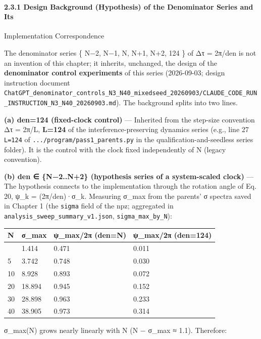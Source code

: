 \documentclass[
  a4paper,
]{ltjsarticle}
\newcounter{none} %
\begin{document}
\paragraph{2.3.1 Design Background (Hypothesis) of the Denominator
Series and
Its}\label{design-background-hypothesis-of-the-denominator-series-and-its}

Implementation Correspondence

The denominator series \{ N−2, N−1, N, N+1, N+2, 124 \} of Δτ = 2π/den
is not an invention of this chapter; it inherits, unchanged, the design
of the \textbf{denominator control experiments} of this series
(2026-09-03; design instruction document
\texttt{ChatGPT\_denominator\_controls\_N3\_N40\_mixedseed\_20260903/CLAUDE\_CODE\_RUN\_INSTRUCTION\_N3\_N40\_20260903.md}).
The background splits into two lines.

\textbf{(a) den=124 (fixed-clock control)} --- Inherited from the
step-size convention Δτ = 2π/L, \textbf{L=124} of the
interference-preserving dynamics series (e.g., line 27 \texttt{L=124} of
\texttt{.../program/pass1\_parents.py} in the qualification-and-seedless
series folder). It is the control with the clock fixed independently of
N (legacy convention).

\textbf{(b) den ∈ \{N−2..N+2\} (hypothesis series of a system-scaled
clock)} --- The hypothesis connects to the implementation through the
rotation angle of Eq. 20, ψ\_k = (2π/den)·σ\_k. Measuring σ\_max from
the parents' σ spectra saved in Chapter 1 (the \texttt{sigma} field of
the npz; aggregated in \texttt{analysis\_sweep\_summary\_v1.json},
\texttt{sigma\_max\_by\_N}):

{\def\LTcaptype{none} %
\begin{longtable}[]{@{}llll@{}}
\toprule\noalign{}
N & σ\_max & ψ\_max/2π (den=N) & ψ\_max/2π (den=124) \\
\midrule\noalign{}
\endhead
\bottomrule\noalign{}
\endlastfoot
3 & 1.414 & 0.471 & 0.011 \\
5 & 3.742 & 0.748 & 0.030 \\
10 & 8.928 & 0.893 & 0.072 \\
20 & 18.894 & 0.945 & 0.152 \\
30 & 28.898 & 0.963 & 0.233 \\
40 & 38.905 & 0.973 & 0.314 \\
\end{longtable}
}

σ\_max(N) grows nearly linearly with N (N − σ\_max ≈ 1.1). Therefore:
\end{document}
